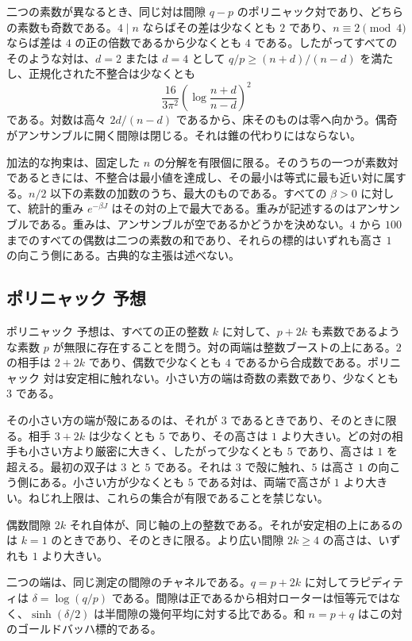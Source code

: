 \documentclass[a4paper]{article}
\theoremstyle{definition}
\theoremstyle{remark}
\begin{document}
二つの素数が異なるとき、同じ対は間隙 \(q-p\) のポリニャック対であり、どちらの素数も奇数である。\(4\mid n\) ならばその差は少なくとも \(2\) であり、\(n\equiv 2\pmod 4\) ならば差は \(4\) の正の倍数であるから少なくとも \(4\) である。したがってすべてのそのような対は、\(d=2\) または \(d=4\) として \(q/p\ge(n+d)/(n-d)\) を満たし、正規化された不整合は少なくとも
\[
\frac{16}{3\pi^2}\left(\log\frac{n+d}{n-d}\right)^2
\]
である。対数は高々 \(2d/(n-d)\) であるから、床そのものは零へ向かう。偶奇がアンサンブルに開く間隙は閉じる。それは錐の代わりにはならない。

加法的な拘束は、固定した \(n\) の分解を有限個に限る。そのうちの一つが素数対であるときには、不整合は最小値を達成し、その最小は等式に最も近い対に属する。\(n/2\) 以下の素数の加数のうち、最大のものである。すべての \(\beta>0\) に対して、統計的重み \(e^{-\beta J}\) はその対の上で最大である。重みが記述するのはアンサンブルである。重みは、アンサンブルが空であるかどうかを決めない。\(4\) から \(100\) までのすべての偶数は二つの素数の和であり、それらの標的はいずれも高さ \(1\) の向こう側にある。古典的な主張は述べない。

\subsection{ポリニャック 予想}

ポリニャック 予想は、すべての正の整数 \(k\) に対して、\(p+2k\) も素数であるような素数 \(p\) が無限に存在することを問う。対の両端は整数ブーストの上にある。\(2\) の相手は \(2+2k\) であり、偶数で少なくとも \(4\) であるから合成数である。ポリニャック 対は安定相に触れない。小さい方の端は奇数の素数であり、少なくとも \(3\) である。

その小さい方の端が殻にあるのは、それが \(3\) であるときであり、そのときに限る。相手 \(3+2k\) は少なくとも \(5\) であり、その高さは \(1\) より大きい。どの対の相手も小さい方より厳密に大きく、したがって少なくとも \(5\) であり、高さは \(1\) を超える。最初の双子は \(3\) と \(5\) である。それは \(3\) で殻に触れ、\(5\) は高さ \(1\) の向こう側にある。小さい方が少なくとも \(5\) である対は、両端で高さが \(1\) より大きい。ねじれ上限は、これらの集合が有限であることを禁じない。

偶数間隙 \(2k\) それ自体が、同じ軸の上の整数である。それが安定相の上にあるのは \(k=1\) のときであり、そのときに限る。より広い間隙 \(2k\ge 4\) の高さは、いずれも \(1\) より大きい。

二つの端は、同じ測定の間隙のチャネルである。\(q=p+2k\) に対してラピディティは \(\delta=\log(q/p)\) である。間隙は正であるから相対ローターは恒等元ではなく、\(\sinh(\delta/2)\) は半間隙の幾何平均に対する比である。和 \(n=p+q\) はこの対のゴールドバッハ標的である。
\end{document}
